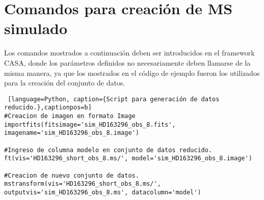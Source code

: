 \chapter{Comandos para creación de MS simulado}
\label{finales:apendice5}

Los comandos mostrados a continuación deben ser introducidos en el framework CASA, donde los parámetros definidos no necesariamente deben llamarse de la misma manera, ya que los mostrados en el código de ejemplo fueron los utilizados para la creación del conjunto de datos. 

\begin{lstlisting} [language=Python, caption={Script para generación de datos reducido.},captionpos=b]
#Creacion de imagen en formato Image
importfits(fitsimage='sim_HD163296_obs_8.fits', imagename='sim_HD163296_obs_8.image')

#Ingreso de columna modelo en conjunto de datos reducido. 
ft(vis='HD163296_short_obs_8.ms/', model='sim_HD163296_obs_8.image')

#Creacion de nuevo conjunto de datos. 
mstransform(vis='HD163296_short_obs_8.ms/', outputvis='sim_HD163296_obs_8.ms', datacolumn='model')

\end{lstlisting}